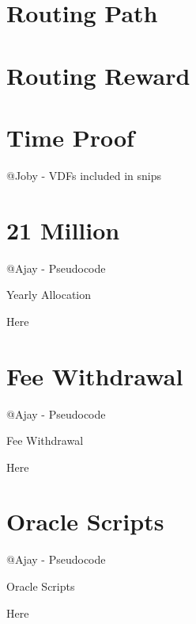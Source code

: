 \documentclass[a4paper,10pt]{article}
\begin{document}
\section{Routing Path}
\section{Routing Reward}
\section{Time Proof}
@Joby - VDFs included in snips
\section{21 Million}
@Ajay - Pseudocode
\begin{algorithm}
\caption{Yearly Allocation}
Here
\end{algorithm}
\section{Fee Withdrawal}
@Ajay - Pseudocode
\begin{algorithm}
\caption{Fee Withdrawal}
Here
\end{algorithm}

\section{Oracle Scripts}
@Ajay - Pseudocode
\begin{algorithm}
\caption{Oracle Scripts}
Here
\end{algorithm}
\end{document}
